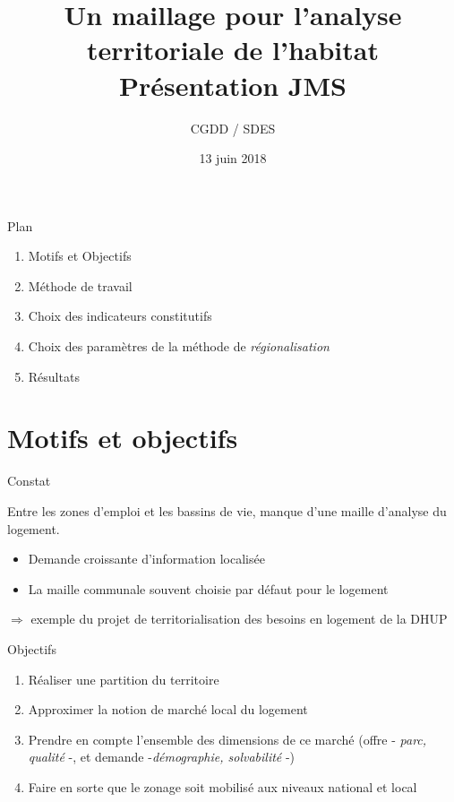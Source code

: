 \documentclass[11pt]{beamer}
\date{13 juin 2018}
\author{CGDD / SDES}
\title{Un maillage pour l'analyse territoriale de l'habitat \\ Présentation JMS}
\begin{document}
\begin{frame}
\titlepage
\end{frame}

\begin{frame}{Plan}
\begin{enumerate}

\item Motifs et Objectifs

\item Méthode de travail

\item Choix des indicateurs constitutifs

\item Choix des paramètres de la méthode de \emph{régionalisation}

\item Résultats 

\vfill
\end{enumerate}
\end{frame}

\section{Motifs et objectifs}

\begin{frame}{Constat}

Entre les zones d'emploi et les bassins de vie, manque d'une maille d'analyse du logement.
\vspace{.3cm}

\begin{itemize}
\item Demande croissante d'information localisée
\item La maille communale souvent choisie par défaut pour le logement
\end{itemize}
\vspace{.3cm}
$\Rightarrow$ exemple du projet de territorialisation des besoins en logement de la DHUP
\end{frame}

\begin{frame}{Objectifs}
\begin{enumerate}
\item Réaliser une partition du territoire
\item Approximer la notion de marché local du logement
\item Prendre en compte l'ensemble des dimensions de ce marché (offre - \emph{parc, qualité} -, et demande -\emph{démographie, solvabilité} -)
\item Faire en sorte que le zonage soit mobilisé aux niveaux national et local
\end{enumerate}
\end{frame}
\end{document}
